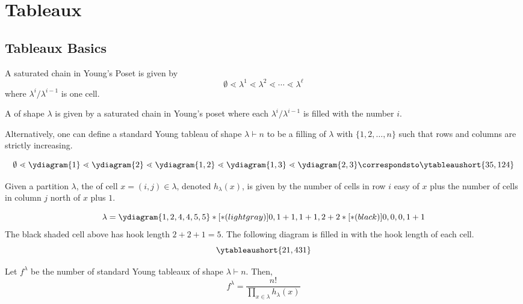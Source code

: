 \documentclass[11pt,leqno,oneside]{amsart}
\numberwithin{thm}{section}
\newcommand{\partitionof}{\vdash}
\newcommand{\coveredby}{\mathrel{\lessdot}}
\begin{document}
\section{Tableaux}
\subsection{Tableaux Basics}
\begin{prop}
  A saturated chain in Young's Poset is given by \[
    \emptyset \coveredby \lambda^1 \coveredby \lambda^2 \coveredby
    \cdots \coveredby \lambda^\ell
  \]
  where \(\lambda^i/\lambda^{i-1}\) is one cell.
\end{prop}
\begin{defn}
  A  of shape \(\lambda\) is given by a
  saturated chain in Young's poset where each
  \(\lambda^i/\lambda^{i-1}\) is filled with the number \(i\).

  Alternatively, one can define a standard Young tableau of shape
  \(\lambda \partitionof n\) to be a filling of \(\lambda\) with
  \(\{1,2,\ldots,n\}\) such that rows and columns are strictly
  increasing.
\end{defn}
\begin{example}
  \[
    \emptyset \coveredby \ydiagram{1} \coveredby \ydiagram{2}
    \coveredby \ydiagram{1,2} \coveredby \ydiagram{1,3} \coveredby
    \ydiagram{2,3} \correspondsto \ytableaushort{35,124}
  \]
\end{example}
\begin{defn}
  Given a partition \(\lambda\), the  of cell \(x =
  (i,j) \in \lambda\), denoted \(h_\lambda(x)\), is given by the
  number of cells in row \(i\) 
  easy of \(x\) plus the number of cells in column \(j\) north of
  \(x\) plus \(1\). 
\end{defn}
\begin{example}
  \[
    \lambda = \ydiagram{1,2,4,4,5,5}*[*(lightgray)]{0,1+1,1+1,2+2}*[*(black)]{0,0,0,1+1}
  \]
  The black shaded cell above has hook length \(2+2+1 = 5\). The
  following diagram is filled in with the hook length of each cell. \[
    \ytableaushort{21,431}
  \]
\end{example}
\begin{prop}
  Let \(f^\lambda\) be the number of standard Young tableaux of shape
  \(\lambda \partitionof n\). Then, \[
    f^\lambda = \frac{n!}{\prod_{x \in \lambda} h_\lambda(x)}
  \]
\end{prop}
\end{document}
